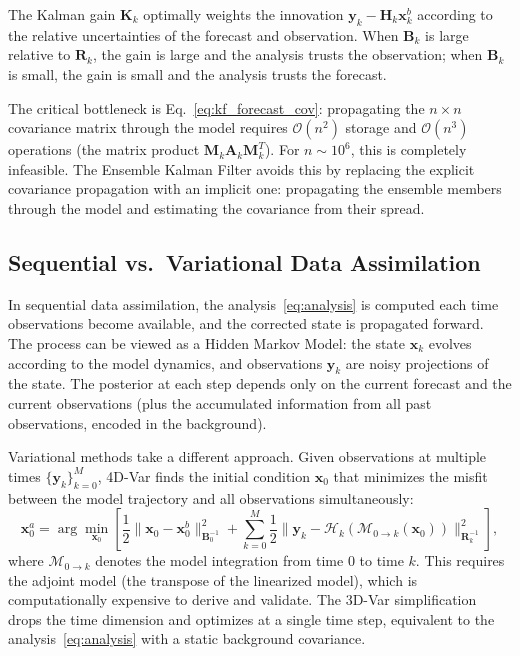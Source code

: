 The Kalman gain $\mathbf{K}_k$ optimally weights the innovation $\mathbf{y}_k - \mathbf{H}_k \mathbf{x}_k^b$ according to the relative uncertainties of the forecast and observation. When $\mathbf{B}_k$ is large relative to $\mathbf{R}_k$, the gain is large and the analysis trusts the observation; when $\mathbf{B}_k$ is small, the gain is small and the analysis trusts the forecast.

The critical bottleneck is Eq.~\eqref{eq:kf_forecast_cov}: propagating the $n \times n$ covariance matrix through the model requires $\mathcal{O}(n^2)$ storage and $\mathcal{O}(n^3)$ operations (the matrix product $\mathbf{M}_k \mathbf{A}_k \mathbf{M}_k^T$). For $n \sim 10^6$, this is completely infeasible. The Ensemble Kalman Filter avoids this by replacing the explicit covariance propagation with an implicit one: propagating the ensemble members through the model and estimating the covariance from their spread.

\subsection{Sequential vs.\ Variational Data Assimilation}
\label{sec:seq_vs_var}

In sequential data assimilation, the analysis~\eqref{eq:analysis} is computed each time observations become available, and the corrected state is propagated forward. The process can be viewed as a Hidden Markov Model: the state $\mathbf{x}_k$ evolves according to the model dynamics, and observations $\mathbf{y}_k$ are noisy projections of the state. The posterior at each step depends only on the current forecast and the current observations (plus the accumulated information from all past observations, encoded in the background).

Variational methods take a different approach. Given observations at multiple times $\{\mathbf{y}_k\}_{k=0}^M$, 4D-Var finds the initial condition $\mathbf{x}_0$ that minimizes the misfit between the model trajectory and all observations simultaneously:
\begin{equation}
\label{eq:4dvar}
\mathbf{x}_0^a = \arg\min_{\mathbf{x}_0} \left[\frac{1}{2}\|\mathbf{x}_0 - \mathbf{x}_0^b\|_{\mathbf{B}_0^{-1}}^2 + \sum_{k=0}^M \frac{1}{2}\|\mathbf{y}_k - \mathcal{H}_k(\mathcal{M}_{0 \to k}(\mathbf{x}_0))\|_{\mathbf{R}_k^{-1}}^2\right],
\end{equation}
where $\mathcal{M}_{0 \to k}$ denotes the model integration from time $0$ to time $k$. This requires the adjoint model (the transpose of the linearized model), which is computationally expensive to derive and validate. The 3D-Var simplification drops the time dimension and optimizes at a single time step, equivalent to the analysis~\eqref{eq:analysis} with a static background covariance.

